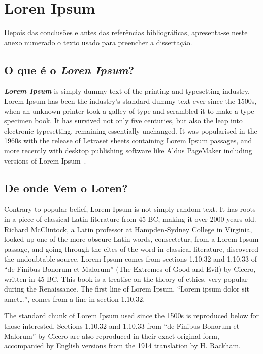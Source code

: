 \chapter{Loren Ipsum} \label{ap1:loren}

Depois das conclusões e antes das referências bibliográficas,
apresenta-se neste anexo numerado o texto usado para preencher a
dissertação.

\section{O que é o \emph{Loren Ipsum}?}

\emph{\textbf{Lorem Ipsum}} is simply dummy text of the printing and
typesetting industry. Lorem Ipsum has been the industry's standard
dummy text ever since the 1500s, when an unknown printer took a galley
of type and scrambled it to make a type specimen book. It has survived
not only five centuries, but also the leap into electronic
typesetting, remaining essentially unchanged. It was popularised in
the 1960s with the release of Letraset sheets containing Lorem Ipsum
passages, and more recently with desktop publishing software like
Aldus PageMaker including versions of Lorem Ipsum~\citep{kn:Lip08}. 

\section{De onde Vem o Loren?}

Contrary to popular belief, Lorem Ipsum is not simply random text. It
has roots in a piece of classical Latin literature from 45 BC, making
it over 2000 years old. Richard McClintock, a Latin professor at
Hampden-Sydney College in Virginia, looked up one of the more obscure
Latin words, consectetur, from a Lorem Ipsum passage, and going
through the cites of the word in classical literature, discovered the
undoubtable source. Lorem Ipsum comes from sections 1.10.32 and
1.10.33 of ``de Finibus Bonorum et Malorum'' (The Extremes of Good and
Evil) by Cicero, written in 45 BC. This book is a treatise on the
theory of ethics, very popular during the Renaissance. The first line
of Lorem Ipsum, ``Lorem ipsum dolor sit amet\ldots'', comes from a line in
section 1.10.32.

The standard chunk of Lorem Ipsum used since the 1500s is reproduced
below for those interested. Sections 1.10.32 and 1.10.33 from ``de
Finibus Bonorum et Malorum'' by Cicero are also reproduced in their
exact original form, accompanied by English versions from the 1914
translation by H. Rackham.

